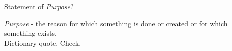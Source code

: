 \documentclass[11pt]{article}
\theoremstyle{plain}
\theoremstyle{definition}
\theoremstyle{remark}
\begin{document}
 \begin{center}
 	\LARGE Statement of \textit{Purpose}?\\[3em]
 \end{center}
\noindent \textit{Purpose} - the reason for which something is done or created or for which something exists.\\

\noindent Dictionary quote. Check.\\
\end{document}
